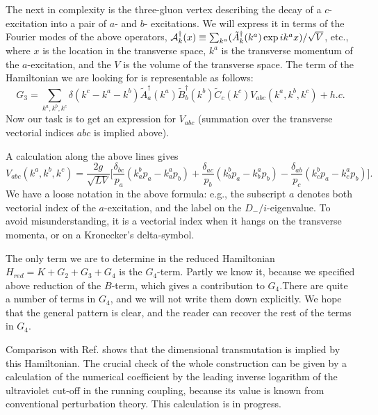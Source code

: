 \documentclass[a4paper,12pt]{article}
\begin{document}
The next in complexity is the 
three-gluon vertex describing the decay 
of a $c$-excitation into 
a pair of $a$- and $b$- excitations. We will express it in terms 
of the Fourier modes of the above
operators, ${\cal A}^\dagger_k(x) \equiv 
\sum_{k^{a}}(\tilde{A}^\dagger_k(k^a)\exp{ik^ax})/\sqrt{V}$, etc., 
where $x$ is the location in the transverse space, 
$k^a$ is the transverse momentum of the 
$a$-excitation, and the $V$ is the volume of the transverse space. 
The term of the Hamiltonian we are looking for is 
representable as follows:
\begin{equation}
\label{fourier}
G_3 = \sum_{k^a,k^b,k^c}\delta(k^c-k^a-k^b)\tilde{A}^\dagger_a(k^a)
\tilde{B}^\dagger_b(k^b)
\tilde{C}_c(k^c)V_{abc}(k^a,k^b,k^c) + h.c.
\end{equation}
Now our task is to get an expression for $V_{abc}$ 
(summation over the transverse vectorial indices $abc$ is implied above).

A calculation along the above lines gives
\begin{equation}
\label{g3}
V_{abc}(k^a, k^b, k^c) = 
\frac{2g}{\sqrt{LV}} \bigg[\frac{\delta_{bc}}{p_a}(k^b_ap_a - k^a_ap_b)
+\frac{\delta_{ac}}{p_b}(k^b_bp_a - k^a_bp_b) - 
\frac{\delta_{ab}}{p_c}(k^b_cp_a - k^a_cp_b) \bigg].
\end{equation}
We have a loose notation in the above formula: e.g., the subscript $a$ 
denotes both vectorial index of the $a$-excitation, 
and the label on the $D_-/i$-eigenvalue. To avoid misunderstanding, 
it is a vectorial index when it hangs on the transverse momenta, 
or on a Kronecker's delta-symbol.

The only term we are to determine in the reduced 
Hamiltonian $H_{red} = K + G_2  + G_3 +G_4$ is the $G_4$-term.
Partly we know it, because we specified above reduction of the $B$-term,
which gives a contribution to $G_4$.There are quite a number 
of terms in $G_4$, and we will not write them down explicitly. 
We hope that the general pattern is 
clear, and the reader can recover the rest of the terms in $G_4$.

Comparison with Ref. \cite{Thorn} shows that the dimensional transmutation 
is implied by this Hamiltonian. The crucial check of 
the whole construction can be given by a calculation of the numerical 
coefficient by the leading inverse logarithm of the ultraviolet 
cut-off in the running coupling, because its value is known from 
conventional perturbation theory. This calculation is in progress. \\
\end{document}

